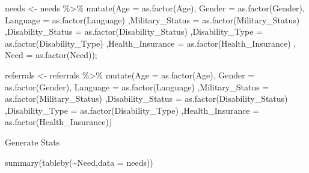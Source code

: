 \documentclass[
]{article}
\newenvironment{Shaded}{\begin{snugshade}}{\end{snugshade}}
\newcommand{\AttributeTok}[1]{\textcolor[rgb]{0.77,0.63,0.00}{#1}}
\newcommand{\FunctionTok}[1]{\textcolor[rgb]{0.00,0.00,0.00}{#1}}
\newcommand{\NormalTok}[1]{#1}
\newcommand{\OtherTok}[1]{\textcolor[rgb]{0.56,0.35,0.01}{#1}}
\newcommand{\SpecialCharTok}[1]{\textcolor[rgb]{0.00,0.00,0.00}{#1}}
\begin{document}
\begin{Shaded}
\begin{Highlighting}[]
\NormalTok{needs }\OtherTok{\textless{}{-}}\NormalTok{ needs }\SpecialCharTok{\%\textgreater{}\%} \FunctionTok{mutate}\NormalTok{(}\AttributeTok{Age =} \FunctionTok{as.factor}\NormalTok{(Age), }\AttributeTok{Gender =} \FunctionTok{as.factor}\NormalTok{(Gender), }\AttributeTok{Language =} \FunctionTok{as.factor}\NormalTok{(Language)}
\NormalTok{                          ,}\AttributeTok{Military\_Status =} \FunctionTok{as.factor}\NormalTok{(Military\_Status)}
\NormalTok{                          ,}\AttributeTok{Disability\_Status =} \FunctionTok{as.factor}\NormalTok{(Disability\_Status)}
\NormalTok{                          ,}\AttributeTok{Disability\_Type =} \FunctionTok{as.factor}\NormalTok{(Disability\_Type)}
\NormalTok{                          ,}\AttributeTok{Health\_Insurance =} \FunctionTok{as.factor}\NormalTok{(Health\_Insurance)}
\NormalTok{                          , }\AttributeTok{Need =} \FunctionTok{as.factor}\NormalTok{(Need));}

\NormalTok{referrals }\OtherTok{\textless{}{-}}\NormalTok{ referrals }\SpecialCharTok{\%\textgreater{}\%} \FunctionTok{mutate}\NormalTok{(}\AttributeTok{Age =} \FunctionTok{as.factor}\NormalTok{(Age), }\AttributeTok{Gender =} \FunctionTok{as.factor}\NormalTok{(Gender), }\AttributeTok{Language =} \FunctionTok{as.factor}\NormalTok{(Language)}
\NormalTok{                          ,}\AttributeTok{Military\_Status =} \FunctionTok{as.factor}\NormalTok{(Military\_Status)}
\NormalTok{                          ,}\AttributeTok{Disability\_Status =} \FunctionTok{as.factor}\NormalTok{(Disability\_Status)}
\NormalTok{                          ,}\AttributeTok{Disability\_Type =} \FunctionTok{as.factor}\NormalTok{(Disability\_Type)}
\NormalTok{                          ,}\AttributeTok{Health\_Insurance =} \FunctionTok{as.factor}\NormalTok{(Health\_Insurance))}
\end{Highlighting}
\end{Shaded}

Generate Stats

\begin{Shaded}
\begin{Highlighting}[]
\FunctionTok{summary}\NormalTok{(}\FunctionTok{tableby}\NormalTok{(}\SpecialCharTok{\textasciitilde{}}\NormalTok{Need,}\AttributeTok{data =}\NormalTok{ needs))}
\end{Highlighting}
\end{Shaded}
\end{document}

